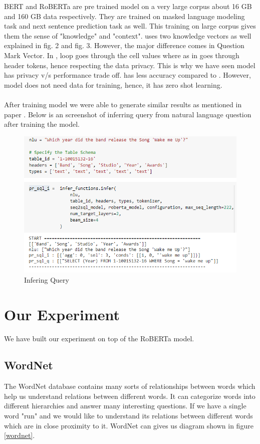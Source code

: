 \documentclass[12pt]{article}
\begin{document}
BERT and RoBERTa are pre trained model on a very large corpus about 16 GB and 160 GB data respectively. They are trained on masked language modeling task and next sentence prediction task as well. This training on large corpus gives them the sense of "knowledge" and "context". \cite{guo2019content} uses two knowledge vectors as well explained in fig. 2 and fig. 3. However, the major difference comes in Question Mark Vector. In \cite{guo2019content}, loop goes through the cell values where as in  \cite{pal2020data} goes through header tokens, hence respecting the data privacy. This is why we have seen  \cite{pal2020data} model has privacy v/s performance trade off.  \cite{pal2020data} has less accuracy compared to \cite{guo2019content}. However, \cite{pal2020data} model does not need data for training, hence, it has zero shot learning. 
\\
\\
After training model we were able to generate similar results as mentioned in paper \cite{pal2020data}. Below is an screenshot of inferring query from natural language question after training the model. 


\begin{figure}[H]
    \includegraphics[width=400pt]{infer}
    \caption{Infering Query}
    \label{fig:Infering Query}
\end{figure}


\section{Our Experiment}
We have built our experiment on top of the RoBERTa model. 

\subsection{WordNet}
The WordNet database contains many sorts of relationships between words which help us understand relations between different words. It can categorize words into different hierarchies and answer many interesting questions. If we have a single word "run" and we would like to understand its relations between different words which are in close proximity to it. WordNet can gives us diagram shown in figure \ref{wordnet}.
\end{document}
